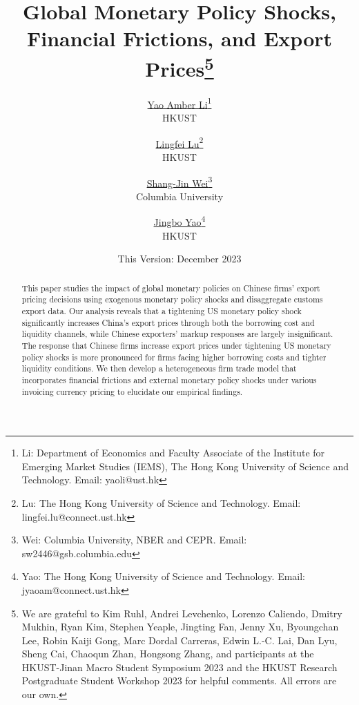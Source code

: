 

\linespread{1.2}
\geometry{a4paper,scale=0.75}
\setlength{\parskip}{0.5em}




\title{\Large \textbf{Global Monetary Policy Shocks, \\Financial Frictions, and Export Prices}\thanks{We are grateful to Kim Ruhl, Andrei Levchenko, Lorenzo Caliendo, Dmitry Mukhin, Ryan Kim, Stephen Yeaple, Jingting Fan, Jenny Xu, Byoungchan Lee, Robin Kaiji Gong, Marc Dordal Carreras, Edwin L.-C. Lai, Dan Lyu, Sheng Cai, Chaoqun Zhan, Hongsong Zhang, and participants at the HKUST-Jinan Macro Student Symposium 2023 and the HKUST Research Postgraduate Student Workshop 2023 for helpful comments. All errors are our own.}}

\author{\large \href{http://yaoli.people.ust.hk/}{Yao Amber Li}\footnote{Li: Department of Economics and Faculty Associate of the Institute for Emerging Market Studies (IEMS), The Hong Kong University of Science and Technology. Email: yaoli@ust.hk}\\ {HKUST}
\and \href{}{Lingfei Lu}\footnote{Lu: The Hong Kong University of Science and Technology. Email: lingfei.lu@connect.ust.hk} \\ {HKUST} 
\and \href{https://users.nber.org/~wei/}{Shang-Jin Wei}\footnote{Wei: Columbia University, NBER and CEPR. Email: sw2446@gsb.columbia.edu} \\ {Columbia University}
\and \href{}{Jingbo Yao}\footnote{Yao: The Hong Kong University of Science and Technology. Email: jyaoam@connect.ust.hk} \\ {HKUST}
}
\date{This Version: December 2023}

\maketitle

\begin{abstract}
This paper studies the impact of global monetary policies on Chinese firms' export pricing decisions using exogenous monetary policy shocks and disaggregate customs export data. Our analysis reveals that a tightening US monetary policy shock significantly increases China's export prices through both the borrowing cost and liquidity channels, while Chinese exporters' markup responses are largely insignificant. The response that Chinese firms increase export prices under tightening US monetary policy shocks is more pronounced for firms facing higher borrowing costs and tighter liquidity conditions. We then develop a heterogeneous firm trade model that incorporates financial frictions and external monetary policy shocks under various invoicing currency pricing to elucidate our empirical findings.

\end{abstract}

